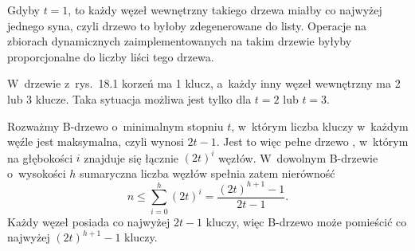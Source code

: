 
\exercise %
Gdyby $t=1$, to każdy węzeł wewnętrzny takiego drzewa miałby co najwyżej jednego syna, czyli drzewo to byłoby zdegenerowane do listy.
Operacje na zbiorach dynamicznych zaimplementowanych na takim drzewie byłyby proporcjonalne do liczby liści tego drzewa.

\exercise %
W~drzewie z~rys.\ 18.1 korzeń ma 1 klucz, a~każdy inny węzeł wewnętrzny ma 2 lub 3 klucze.
Taka sytuacja możliwa jest tylko dla $t=2$ lub $t=3$.

\exercise %

\exercise %
Rozważmy B-drzewo o~minimalnym stopniu $t$, w~którym liczba kluczy w~każdym węźle jest maksymalna, czyli wynosi $2t-1$.
Jest to więc pełne drzewo , w~którym na głębokości $i$ znajduje się łącznie $(2t)^i$ węzłów.
W~dowolnym B-drzewie o~wysokości $h$ sumaryczna liczba węzłów spełnia zatem nierówność
\[
	n \le \sum_{i=0}^h(2t)^i = \frac{(2t)^{h+1}-1}{2t-1}.
\]
Każdy węzeł posiada co najwyżej $2t-1$ kluczy, więc B-drzewo może pomieścić co najwyżej $(2t)^{h+1}-1$ kluczy.

\exercise %
